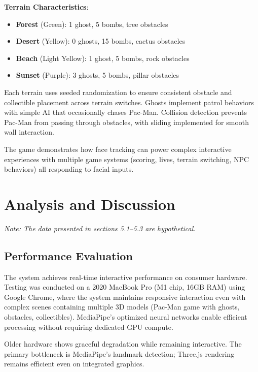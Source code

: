 \documentclass[sigconf]{acmart}
\begin{document}
\textbf{Terrain Characteristics}:
\begin{itemize}
\item \textbf{Forest} (Green): 1 ghost, 5 bombs, tree obstacles
\item \textbf{Desert} (Yellow): 0 ghosts, 15 bombs, cactus obstacles
\item \textbf{Beach} (Light Yellow): 1 ghost, 5 bombs, rock obstacles
\item \textbf{Sunset} (Purple): 3 ghosts, 5 bombs, pillar obstacles
\end{itemize}

Each terrain uses seeded randomization to ensure consistent obstacle and collectible placement across terrain switches. Ghosts implement patrol behaviors with simple AI that occasionally chases Pac-Man. Collision detection prevents Pac-Man from passing through obstacles, with sliding implemented for smooth wall interaction.

The game demonstrates how face tracking can power complex interactive experiences with multiple game systems (scoring, lives, terrain switching, NPC behaviors) all responding to facial inputs.

\section{Analysis and Discussion}
\label{sec:analysis}

\noindent\textit{Note: The data presented in sections 5.1--5.3 are hypothetical.}

\vspace{0.5em}

\subsection{Performance Evaluation}

The system achieves real-time interactive performance on consumer hardware. Testing was conducted on a 2020 MacBook Pro (M1 chip, 16GB RAM) using Google Chrome, where the system maintains responsive interaction even with complex scenes containing multiple 3D models (Pac-Man game with ghosts, obstacles, collectibles). MediaPipe's optimized neural networks enable efficient processing without requiring dedicated GPU compute.

Older hardware shows graceful degradation while remaining interactive. The primary bottleneck is MediaPipe's landmark detection; Three.js rendering remains efficient even on integrated graphics.
\end{document}
